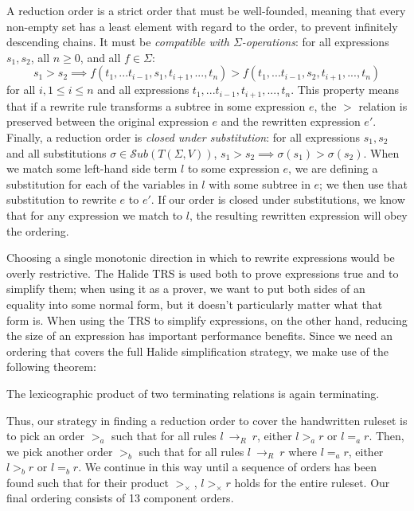 \documentclass[acmsmall,review]{acmart}\settopmatter{printfolios=true,printccs=false,printacmref=false}
\newcommand{\rewrites}[0]{\:\rightarrow_{R}\:}
\begin{document}
A reduction order is a strict order that must be well-founded, meaning that every non-empty set has a least element with regard to the order, to prevent infinitely descending chains. It must be \emph{compatible with $\Sigma$-operations}: for all expressions $s_1, s_2$, all $n \geq 0$, and all $f \in \Sigma$:
\[
s_1 > s_2 \implies f(t_1,...t_{i-1},s_1,t_{i+1},...,t_n) > f(t_1,...t_{i-1},s_2,t_{i+1},...,t_n)
\]
for all $i, 1 \leq i \leq n$ and all expressions $t_1,...t_{i-1},t_{i+1},...,t_n$. This property means that if a rewrite rule transforms a subtree in some expression $e$, the $>$ relation is preserved between the original expression $e$ and the rewritten expression $e'$. Finally, a reduction order is \emph{closed under substitution}: for all expressions $s_1, s_2$ and all substitutions $\sigma \in \mathcal{S}ub(T(\Sigma,V))$, 
$s_1 > s_2 \implies \sigma(s_1) > \sigma(s_2)$. When we match some left-hand side term $l$ to some expression $e$, we are defining a substitution for each of the variables in $l$ with some subtree in $e$; we then use that substitution to rewrite $e$ to $e'$. If our order is closed under substitutions, we know that for any expression we match to $l$, the resulting rewritten expression will obey the ordering.

Choosing a single monotonic direction in which to rewrite expressions would be overly restrictive. 
The Halide TRS is used both to prove expressions true and to simplify them; when using it as a prover, we want to put both sides of an equality into some normal form, but it doesn't particularly matter what that form is. When using the TRS to simplify expressions, on the other hand, reducing the size of an expression has important performance benefits. Since we need an ordering that covers the full Halide simplification strategy, we make use of the following theorem:

\begin{theorem}
The lexicographic product of two terminating relations is again terminating.
\end{theorem}

Thus, our strategy in finding a reduction order to cover the handwritten ruleset is to pick an order $>_a$ such that for all rules $l \rewrites r$, either $l >_a r$ or $l =_a r$. Then, we pick another order $>_b$ such that for all rules $l \rewrites r$ where $l =_a r$, either $l >_b r$ or $l =_b r$. We continue in this way until a sequence of orders has been found such that for their product $>_{\times}$, $l >_{\times} r$ holds for the entire ruleset.  Our final ordering consists of 13 component orders.
\end{document}
